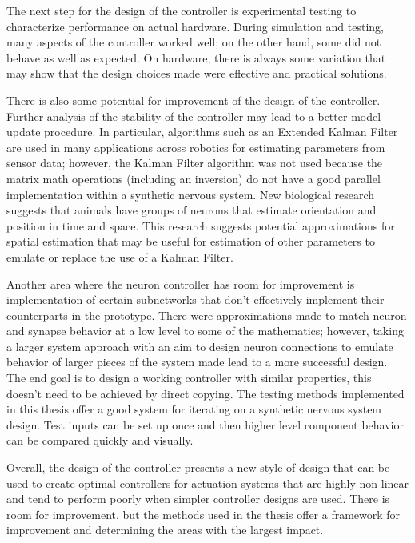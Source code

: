 The next step for the design of the controller is experimental testing to
characterize performance on actual hardware. During simulation and testing,
many aspects of the controller worked well; on the other hand, some did not
behave as well as expected. On hardware, there is always some variation that may
show that the design choices made were effective and practical solutions.

There is also some potential for improvement of the design of the controller.
Further analysis of the stability of the controller may lead to a better model
update procedure. In particular, algorithms such as an Extended Kalman Filter
are used in many applications across robotics for estimating parameters from
sensor data; however, the Kalman Filter algorithm was not used because the matrix math operations (including an inversion) do
not have a good parallel implementation within a synthetic nervous system.
New biological research %
suggests that animals have groups of neurons that estimate orientation and
position in time and space. This research suggests potential approximations for
spatial estimation that may be useful for estimation of other parameters to
emulate or replace the use of a Kalman Filter.

Another area where the neuron controller has room for improvement is
implementation of certain subnetworks that don't effectively implement their
counterparts in the prototype. There were approximations made to match neuron
and synapse behavior at a low level to some of the mathematics; however, taking
a larger system approach with an aim to design neuron connections to emulate
behavior of larger pieces of the system made lead to a more successful design.
The end goal is to design a working controller with similar properties, this
doesn't need to be achieved by direct copying. The testing methods implemented
in this thesis offer a good system for iterating on a synthetic nervous system design. Test
inputs can be set up once and then higher level component behavior can be
compared quickly and visually.

Overall, the design of the controller presents a new style of design that can be
used to create optimal controllers for actuation systems that are highly
non-linear and tend to perform poorly when simpler controller designs are used.
There is room for improvement, but the methods used in the thesis offer a
framework for improvement and determining the areas with the largest impact.

